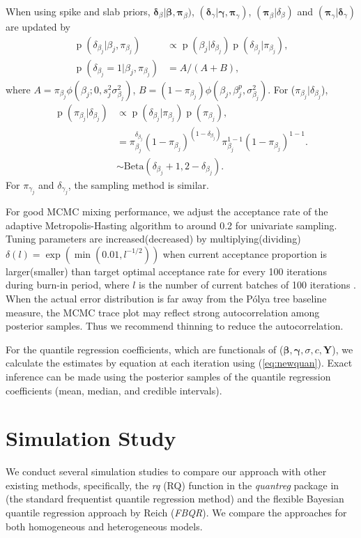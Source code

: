 \documentclass[12pt]{article}
\newcommand{\polya}{P\'{o}lya}
\DeclareMathOperator{\pr}{p}
\begin{document}
When using spike and slab priors,
$ \bm \delta_{\beta}|\bm \beta, \bm \pi_{\beta})$, $(\bm \delta_{\gamma}|\bm
\gamma, \bm \pi_{\gamma})$, $(\bm \pi_{\beta}|\delta_{\beta})$ and
$(\bm \pi_{\gamma}|\bm \delta_{\gamma})$ are updated by
\begin{align*}
  \pr(\delta_{\beta_j}|\beta_j, \pi_{\beta_j}) & \propto \pr(\beta_j |
  \delta_{\beta_j})
  \pr(\delta_{\beta_j}|\pi_{\beta_j}) ,\\
  \pr(\delta_{\beta_j} = 1|\beta_j, \pi_{\beta_j})& = A/(A + B),
\end{align*}
where $A = \pi_{\beta_j}\phi (\beta_j;0, s_j^2\sigma_{\beta_j}^2)$, $B
= (1-\pi_{\beta_j})\phi(\beta_j, \beta_j^p, \sigma_{\beta_j}^2)$.  For
($\pi_{\beta_j}|\delta_{\beta_j}$),
\begin{align*}
  \pr(\pi_{\beta_j}| \delta_{\beta_j}) & \propto \pr(\delta_{\beta_j}|\pi_{\beta_j}) \pr(\pi_{\beta_j}) ,\\
  & = \pi_{\beta_j}^{\delta_{\beta_j}} (1 - \pi_{\beta_j})^{(1 -
    \delta_{\beta_j})}
  \pi_{\beta_j}^{1 - 1}(1 - \pi_{\beta_j})^{1-1}.\\
  & \sim \mbox{Beta}(\delta_{\beta_j} + 1, 2 - \delta_{\beta_j}).
\end{align*}
For $\pi_{\gamma_j}$ and $\delta_{\gamma_j}$, the sampling method is
similar.

For good MCMC mixing performance, we adjust the acceptance rate of the
adaptive Metropolis-Hasting algorithm to around 0.2 for univariate
sampling. Tuning parameters are increased(decreased) by
multiplying(dividing) $\delta(l) = \exp(\min(0.01, l^{-1/2}))$ when
current acceptance proportion is larger(smaller) than target optimal
acceptance rate for every 100 iterations during burn-in period, where
$l$ is the number of current batches of 100 iterations
\citep{jara2009}. When the actual error distribution is far away from
the \polya{} tree baseline measure, the MCMC trace plot may reflect strong
autocorrelation among posterior samples. Thus we recommend thinning
to reduce the autocorrelation.

For the quantile regression coefficients, which are functionals of
($\bm \beta, \bm \gamma, \sigma, c, \bm Y$), we calculate the
estimates by equation at each iteration using
(\ref{eq:newquan}). Exact inference can be made using the posterior
samples of the quantile regression coefficients (mean, median, and
credible intervals).

\section{Simulation Study}
\label{sec:simulations}
We conduct several simulation studies to compare our approach with
other existing methods, specifically, the \textit{rq} (RQ) function in the
\textit{quantreg} package \citep{quantreg} in \cite{R} (the standard
frequentist quantile regression method) and the flexible Bayesian
quantile regression approach by Reich (\textit{FBQR}).  We compare the
approaches for both homogeneous and heterogeneous models.
\end{document}
